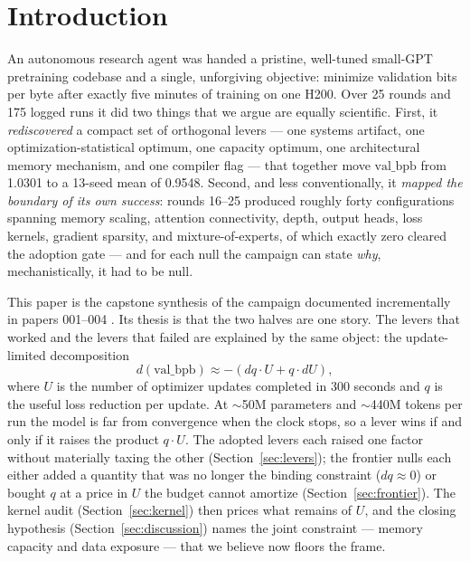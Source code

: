 \documentclass{article}
\newcommand{\valbpb}{\mathrm{val\_bpb}}
\begin{document}
\section{Introduction}
\label{sec:intro}

An autonomous research agent was handed a pristine, well-tuned small-GPT pretraining codebase \cite{karpathy2025nanochat} and a single, unforgiving objective: minimize validation bits per byte after exactly five minutes of training on one H200. Over 25 rounds and 175 logged runs it did two things that we argue are equally scientific. First, it \emph{rediscovered} a compact set of orthogonal levers --- one systems artifact, one optimization-statistical optimum, one capacity optimum, one architectural memory mechanism, and one compiler flag --- that together move $\valbpb$ from 1.0301 to a 13-seed mean of 0.9548. Second, and less conventionally, it \emph{mapped the boundary of its own success}: rounds 16--25 produced roughly forty configurations spanning memory scaling, attention connectivity, depth, output heads, loss kernels, gradient sparsity, and mixture-of-experts, of which exactly zero cleared the adoption gate --- and for each null the campaign can state \emph{why}, mechanistically, it had to be null.

This paper is the capstone synthesis of the campaign documented incrementally in papers 001--004 \cite{ophis2026paper001,ophis2026paper002,ophis2026paper003,ophis2026paper004}. Its thesis is that the two halves are one story. The levers that worked and the levers that failed are explained by the same object: the update-limited decomposition
\begin{equation}
\label{eq:qu}
d(\valbpb) \approx -\left( dq \cdot U + q \cdot dU \right),
\end{equation}
where $U$ is the number of optimizer updates completed in 300 seconds and $q$ is the useful loss reduction per update. At $\sim$50M parameters and $\sim$440M tokens per run the model is far from convergence when the clock stops, so a lever wins if and only if it raises the product $q \cdot U$. The adopted levers each raised one factor without materially taxing the other (Section~\ref{sec:levers}); the frontier nulls each either added a quantity that was no longer the binding constraint ($dq \approx 0$) or bought $q$ at a price in $U$ the budget cannot amortize (Section~\ref{sec:frontier}). The kernel audit (Section~\ref{sec:kernel}) then prices what remains of $U$, and the closing hypothesis (Section~\ref{sec:discussion}) names the joint constraint --- memory capacity and data exposure --- that we believe now floors the frame.
\end{document}
